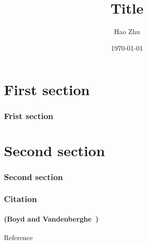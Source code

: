 \documentclass[usepdftitle=false]{beamer}
\title{Title}
\author{Hao Zhu}
\institute{Department of Computer Science\\University of Freiburg}
\date{\today}
\begin{document}
\begin{frame}[plain]
    \titlepage{}
\end{frame}

\section{First section}
\begin{frame}
    \frametitle{Frist section}
    
\end{frame}

\section{Second section}
\begin{frame}
    \frametitle{Second section}

\end{frame}

\begin{frame}
    \frametitle{Citation}
    \framesubtitle{(Boyd and Vandenberghe~\cite{boyd2004convex})}

\end{frame}

\begin{frame}[plain]{Reference}
    \footnotesize
    \nocite{*}
    
\end{frame}
\end{document}
